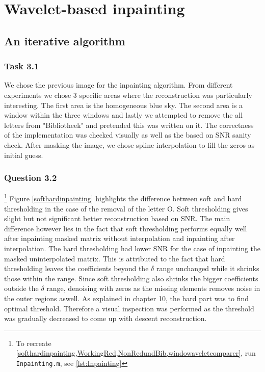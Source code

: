 \documentclass[a4paper]{article}
\begin{document}
	\newpage
	
    \section{Wavelet-based inpainting} \label{sec:Inpainting}

    \subsection{An iterative algorithm}

\subsubsection{Task 3.1}
We chose the previous image for the inpainting algorithm. From different experiments we chose 3 specific areas where the reconstruction was particularly interesting. The first area is the homogeneous blue sky. The second area is a window within the three windows and lastly we attempted to remove the all letters from "Bibliotheek" and pretended this was written on it. The correctness of the implementation was checked visually as well as the based on SNR sanity check. After masking the image, we chose spline interpolation to fill the zeros as initial guess. 
\subsubsection{Question 3.2}

\footnote{To recreate \cref{softhardinpainting,WorkingRed,NonRedundBib,windowaveletcomparer}, run \texttt{Inpainting.m}, see \cref{lst:Inpainting}} Figure \ref{softhardinpainting} highlights the difference between soft and hard thresholding in the case of the removal of the letter O. Soft thresholding gives slight but not significant better reconstruction based on SNR. The main difference however lies in the fact that soft thresholding performs equally well after inpainting masked matrix without interpolation and inpainting after interpolation. The hard thresholding had lower SNR for the case of inpainting the masked uninterpolated matrix. This is attributed to the fact that hard thresholding leaves the coefficients beyond the $\delta$ range unchanged while it shrinks those within the range. Since soft thresholding also shrinks the bigger coefficients outside the $\delta$ range, denoising with zeros as the missing elements removes noise in the outer regions aswell. As explained in chapter 10, the hard part was to find optimal threshold. Therefore a visual inspection was performed as the threshold was gradually decreased to come up with descent reconstruction.
\end{document}
